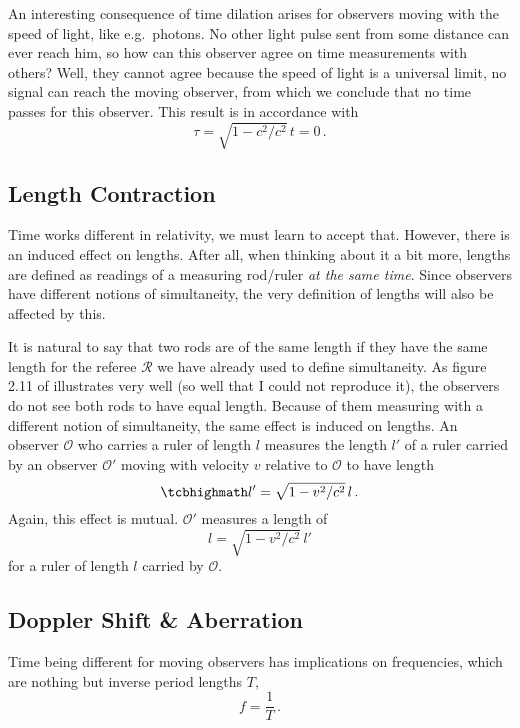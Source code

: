 An interesting consequence of time dilation arises for observers moving with the speed of light, like e.g.~photons. No other light pulse sent from some distance can ever reach him, so how can this observer agree on time measurements with others? Well, they cannot agree because the speed of light is a universal limit, no signal can reach the moving observer, from which we conclude that no time passes for this observer. This result is in accordance with
\begin{equation}
	\tau = \sqrt{1 - c^2 / c^2} \, t = 0 \, .
\end{equation}



		\subsection{Length Contraction}
Time works different in relativity, we must learn to accept that. However, there is an induced effect on lengths. After all, when thinking about it a bit more, lengths are defined as readings of a measuring rod/ruler \emph{at the same time}. Since observers have different notions of simultaneity, the very definition of lengths will also be affected by this.


It is natural to say that two rods are of the same length if they have the same length for the referee $\mathcal{R}$ we have already used to define simultaneity. As figure 2.11 of \cite{dragon_geometry_srt} illustrates very well (so well that I could not reproduce it), the observers do not see both rods to have equal length. Because of them measuring with a different notion of simultaneity, the same effect is induced on lengths. An observer $\mathcal{O}$ who carries a ruler of length $l$ measures the length $l'$ of a ruler carried by an observer $\mathcal{O}'$ moving with velocity $v$ relative to $\mathcal{O}$ to have length
\begin{equation}\label{eq:length_contraction}
	\eqbox{
	l' = \sqrt{1 - v^2 / c^2} \, l
	} \, .
\end{equation}
Again, this effect is mutual. $\mathcal{O}'$ measures a length of
\begin{equation*}
	l = \sqrt{1 - v^2 / c^2} \, l'
\end{equation*}
for a ruler of length $l$ carried by $\mathcal{O}$.




		\subsection{Doppler Shift \& Aberration}
Time being different for moving observers has implications on frequencies, which are nothing but inverse period lengths $T$,
\begin{equation}
	f = \frac{1}{T} \, .
\end{equation}


